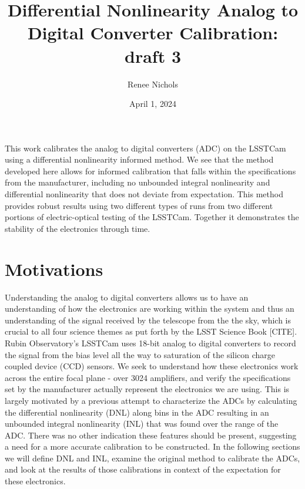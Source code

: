 \documentclass[11pt, letterpaper]{article}
\title{Differential Nonlinearity Analog to Digital Converter Calibration: draft 3}
\author{Renee Nichols}
\date{April 1, 2024}
\begin{document}
\maketitle 

This work calibrates the analog to digital converters (ADC) on the LSSTCam using a differential nonlinearity informed method. 
We see that the method developed here allows for informed calibration that falls within the specifications from the manufacturer, including no unbounded integral nonlinearity and differential nonlinearity that does not deviate from expectation. 
This method provides robust results using two different types of runs from two different portions of electric-optical testing of the LSSTCam. 
Together it demonstrates the stability of the electronics through time. 

\section{Motivations}
\indent

 
Understanding the analog to digital converters allows us to have an understanding of how the electronics are working within the system and thus an understanding of the signal received by the telescope from the the sky, which is crucial to all four science themes as put forth by the LSST Science Book [CITE]. 
Rubin Observatory’s LSSTCam uses 18-bit analog to digital converters to record the signal from the bias level all the way to saturation of the silicon charge coupled device (CCD) sensors. 
We seek to understand how these electronics work across the entire focal plane - over 3024 amplifiers, and verify the specifications set by the manufacturer actually represent the electronics we are using. 
This is largely motivated by a previous attempt to characterize the ADCs by calculating the differential nonlinearity (DNL) along bins in the ADC resulting in an unbounded integral nonlinearity (INL) that was found over the range of the ADC. 
There was no other indication these features should be present, suggesting a need for a more accurate calibration to be constructed. 
In the following sections we will define DNL and INL, examine the original method to calibrate the ADCs, and look at the results of those calibrations in context of the expectation for these electronics. 
\end{document}
